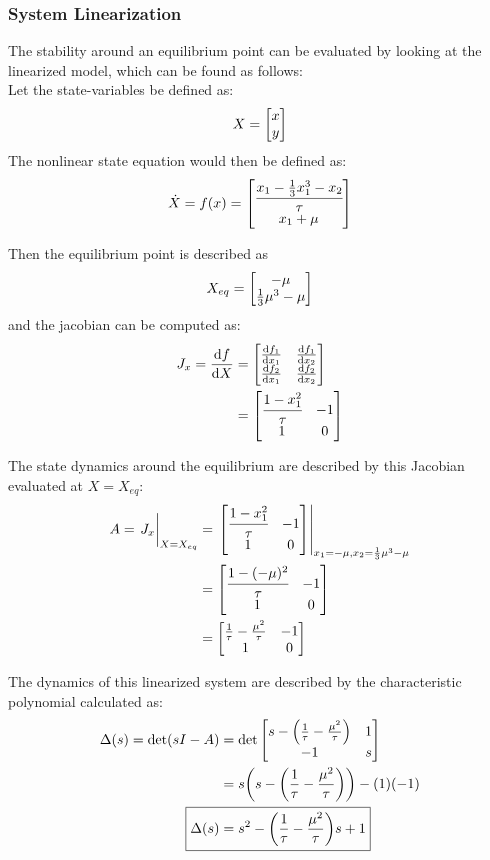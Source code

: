\documentclass[letter]{article}
\numberwithin{equation}{section}
\begin{document}
\newpage
\subsubsection{System Linearization}
The stability around an equilibrium point can be evaluated by looking at the linearized model, which can be found as follows:\\

Let the state-variables be defined as:
$$X = \mqty[x\\ y]$$
The nonlinear state equation would then be defined as:
\begin{equation}
	\dot{X} = f(x) 
	= \mqty[\cfrac{x_1 - \frac{1}{3} x_1^3 - x_2}{\tau}\\
			x_1 + \mu]
\end{equation}

Then the equilibrium point is described as
$$X_{eq} = \mqty[-\mu\\ \frac{1}{3} \mu^3 - \mu]$$
and the jacobian can be computed as:
\begin{align}
	J_x = \dv{f}{X} &= \mqty[\dv{f_1}{x_1} &\dv{f_1}{x_2}\\ \dv{f_2}{x_1} & \dv{f_2}{x_2}]\\
	&= \mqty[\cfrac{1 - x_1^2}{\tau} & -1\\
			 1 & 0]
\end{align}

The state dynamics around the equilibrium are described by this Jacobian evaluated at $X = X_{eq}$:
\begin{align}
	A = \eval{J_x}_{X = X_{eq}}
	&= \eval{\mqty[\cfrac{1 - x_1^2}{\tau} & -1\\ 1 & 0]}_{x_1 = -\mu, x_2 = \frac{1}{3} \mu^3 - \mu}\\
	&= \mqty[\cfrac{1 - (-\mu)^2}{\tau} & -1\\ 1 & 0]\\
	&= \mqty[\frac{1}{\tau} - \frac{\mu^2}{\tau} &-1\\ 1 &0]
\end{align}

The dynamics of this linearized system are described by the characteristic polynomial calculated as:
\begin{align}
	\Delta(s) = \det(sI - A)
	&= \det\mqty[s-\qty(\frac{1}{\tau} - \frac{\mu^2}{\tau}) &1\\ -1 &s]\\
	&= s \qty(s-\qty(\frac{1}{\tau} - \frac{\mu^2}{\tau})) - (1)(-1)\\
	\Aboxed{\Delta(s) &= s^2 - \qty(\frac{1}{\tau} - \frac{\mu^2}{\tau}) s + 1}
\end{align}
\end{document}
